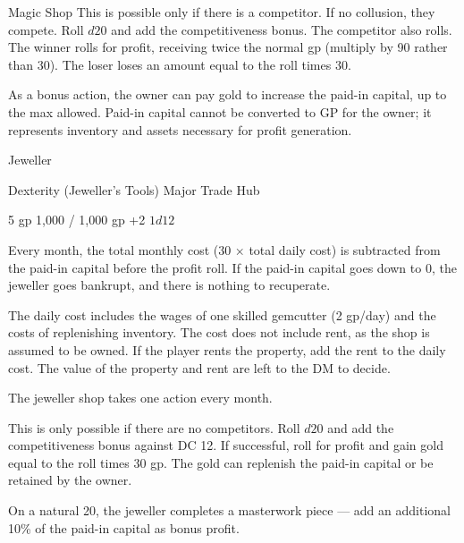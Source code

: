 \documentclass[twocolumn]{dndbook}
\begin{document}
\begin{DndMonster}[width=.5\textwidth - 8pt]{Magic Shop}
	This is possible only if there is a competitor. If no collusion, they compete.
	Roll $d20$ and add the competitiveness bonus.
	The competitor also rolls.
	The winner rolls for profit, receiving twice the normal gp (multiply by 90 rather than 30).
	The loser loses an amount equal to the roll times 30.

	As a bonus action, the owner can pay gold to increase
	the paid-in capital, up to the max allowed.
	Paid-in capital cannot be converted to GP for the owner; it represents inventory and assets necessary for profit generation.
\end{DndMonster}

\begin{DndMonster}[width=.5\textwidth - 8pt]{Jeweller}

	\hfill Dexterity (Jeweller's Tools)
	\hfill Major Trade Hub

	\hfill 5 gp
	\hfill 1,000 / 1,000 gp
	\hfill +2
	\hfill $1d12$

	Every month, the total monthly cost (30 × total daily cost) is subtracted
	from the paid-in capital before the profit roll.
	If the paid-in capital goes down to 0, the jeweller goes bankrupt,
	and there is nothing to recuperate.\par

	The daily cost includes the wages of one skilled gemcutter (2 gp/day)
	and the costs of replenishing inventory.
	The cost does not include rent, as the shop is assumed to be owned.
	If the player rents the property, add the rent to the daily cost.
	The value of the property and rent are left to the DM to decide.\par

	The jeweller shop takes one action every month.

	This is only possible if there are no competitors.
	Roll $d20$ and add the competitiveness bonus against DC 12.
	If successful, roll for profit and gain gold equal to the roll
	times 30 gp. The gold can replenish the paid-in capital or be retained by the owner.\par
	On a natural 20, the jeweller completes a masterwork piece — add an additional 10\% of the paid-in capital as bonus profit.


\end{DndMonster}
\end{document}
